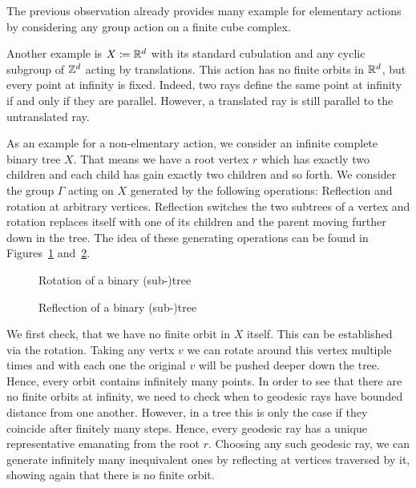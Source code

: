\begin{bsp}
  The previous observation already provides many example for elementary actions by considering any group action on a finite cube complex.

  Another example is \(X \coloneqq \mathbb{R}^d\) with its standard cubulation and any cyclic subgroup of \(\mathbb{Z}^d\) acting by translations. This action has no finite orbits in \(\mathbb{R}^d\), but every point at infinity is fixed. Indeed, two rays define the same point at infinity if and only if they are parallel. However, a translated ray is still parallel to the untranslated ray.

  As an example for a non-elmentary action, we consider an infinite complete binary tree \(X\). That means we have a root vertex \(r\) which has exactly two children and each child has gain exactly two children and so forth. We consider the group \(\Gamma\) acting on \(X\) generated by the following operations: Reflection and rotation at arbitrary vertices. Reflection switches the two subtrees of a vertex and rotation replaces itself with one of its children and the parent moving further down in the tree. The idea of these generating operations can be found in Figures~\ref{fig:rotation} and~\ref{fig:reflection}.

  \begin{figure}[htbp]{}
    \centering
    
    \caption{Rotation of a binary (sub-)tree}
    \label{fig:rotation}
  \end{figure}

  \begin{figure}[htbp]
    \centering
    
    \caption{Reflection of a binary (sub-)tree}
    \label{fig:reflection}
  \end{figure}
  We first check, that we have no finite orbit in \(X\) itself. This can be established via the rotation. Taking any vertx \(v\) we can rotate around this vertex multiple times and with each one the original \(v\) will be pushed deeper down the tree. Hence, every orbit contains infinitely many points. In order to see that there are no finite orbits at infinity, we need to check when to geodesic rays have bounded distance from one another. However, in a tree this is only the case if they coincide after finitely many steps. Hence, every geodesic ray has a unique representative emanating from the root \(r\). Choosing any such geodesic ray, we can generate infinitely many inequivalent ones by reflecting at vertices traversed by it, showing again that there is no finite orbit.
\end{bsp}


